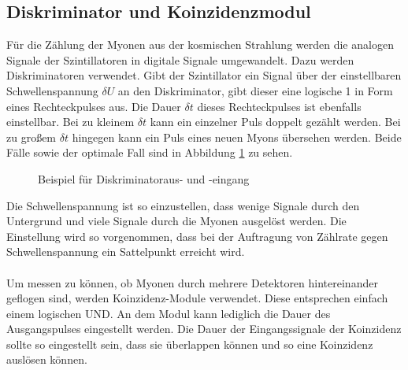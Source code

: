 \subsection{Diskriminator und Koinzidenzmodul}
Für die Zählung der Myonen aus der kosmischen Strahlung werden die analogen Signale der Szintillatoren in digitale Signale umgewandelt. Dazu werden Diskriminatoren verwendet. Gibt der Szintillator ein Signal über der einstellbaren Schwellenspannung $\delta U$ an den Diskriminator, gibt dieser eine logische 1 in Form eines Rechteckpulses aus. Die Dauer $\delta t$ dieses Rechteckpulses ist ebenfalls einstellbar. Bei zu kleinem $\delta t$ kann ein einzelner Puls doppelt gezählt werden. Bei zu großem $\delta t$ hingegen kann ein Puls eines neuen Myons übersehen werden. Beide Fälle sowie der optimale Fall sind in Abbildung \ref{fig:diskriminator} zu sehen.

\begin{figure}[h]
  \centering
  \caption{Beispiel für Diskriminatoraus- und -eingang}
  \label{fig:diskriminator}
\end{figure}

Die Schwellenspannung ist so einzustellen, dass wenige Signale durch den Untergrund und viele Signale durch die Myonen ausgelöst werden. Die Einstellung wird so vorgenommen, dass bei der Auftragung von Zählrate gegen Schwellenspannung ein Sattelpunkt erreicht wird. \\ \\
Um messen zu können, ob Myonen durch mehrere Detektoren hintereinander geflogen sind, werden Koinzidenz-Module verwendet. Diese entsprechen einfach einem logischen UND. An dem Modul kann lediglich die Dauer des Ausgangspulses eingestellt werden. Die Dauer der Eingangssignale der Koinzidenz sollte so eingestellt sein, dass sie überlappen können und so eine Koinzidenz auslösen können.
 
